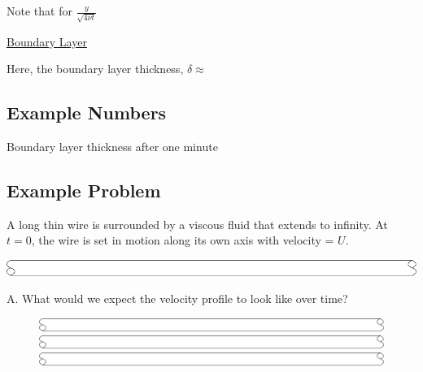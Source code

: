 \documentclass[paper=a4, fontsize=12pt]{scrartcl} %
\numberwithin{equation}{section} %
\numberwithin{figure}{section} %
\numberwithin{table}{section} %
\begin{document}
\newpage

Note that for $\frac{y}{\sqrt{4 \nu t}}$

\vspace{1cm} \underline{Boundary Layer}

\vspace{1cm} Here, the boundary layer thickness, $\delta \approx$

\vspace{3cm} \subsection*{Example Numbers}
Boundary layer thickness after one minute

\vspace{5cm} \subsection*{Example Problem}
A long thin wire is surrounded by a viscous fluid that extends to infinity. At $t=0$, the wire is set in motion along its own axis with velocity = $U$.

\vspace{2cm} \includegraphics[scale=0.9]{wire.pdf}


\vspace{10ex}  
A. What would we expect the velocity profile to look like over time?
\vspace{15ex}  
\begin{figure}[ht]
\centering
\begin{minipage}[b]{0.3\linewidth}
\includegraphics[scale=0.3]{wire.pdf}
\end{minipage}
\quad
\begin{minipage}[b]{0.3\linewidth}
\includegraphics[scale=0.3]{wire.pdf}
\end{minipage}
\quad
\begin{minipage}[b]{0.3\linewidth}
\includegraphics[scale=0.3]{wire.pdf}
\end{minipage}
\end{figure}
\end{document}
